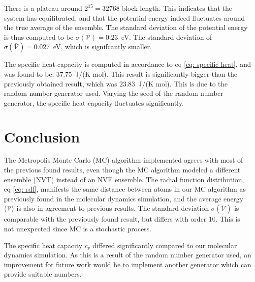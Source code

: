 \documentclass[a4paper]{article}
\newcommand{\newparagraph}{\vspace{.5cm}\noindent}
\newcommand{\average}[1]{\langle #1 \rangle}
\begin{document}
There is a plateau around $2^{15} = 32768$ block length. This indicates that the system has equilibrated, and that the potential energy indeed fluctuates around the true average of the ensemble.
The standard deviation of the potential energy is thus computed to be $\sigma(\mathcal{V}) = 0.23$~eV.
The standard deviation of $\sigma(\bar{\mathcal{V}}) = 0.027$~eV, which is signifcantly smaller.

\newparagraph
The specific heat-capacity is computed in accordance to eq \eqref{eq: specific heat}, and was found to be: $37.75$~J/(K mol).
This result is significantly bigger than the previously obtained result, which was $23.83$~J/(K mol).
This is due to the random number generator used.
Varying the seed of the random number generator, the specific heat capacity fluctuates significantly.


\section*{Conclusion}
The Metropolis Monte Carlo (MC) algorithm implemented agrees with most of the previous found results, even though the MC algorithm modeled a different ensemble (NVT) instead of an NVE ensemble.
The radial function distribution, eq \eqref{eq: rdf}, manifests the same distance between atoms in our MC algorithm as previously found in the molecular dynamics simulation, and the average energy $\average{\mathcal{V}}$ is also in agreement to previous results.
The standard deviation $\sigma(\bar{\mathcal{V}})$ is comparable with the previously found result, but differs with order 10. This is not unexpected since MC is a stochastic process.

\newparagraph
The specific heat capacity $c_v$ differed significantly compared to our molecular dynamics simulation.
As this is a result of the random number generator used, an improvement for future work would be to implement another generator which can provide suitable numbers.
\end{document}
